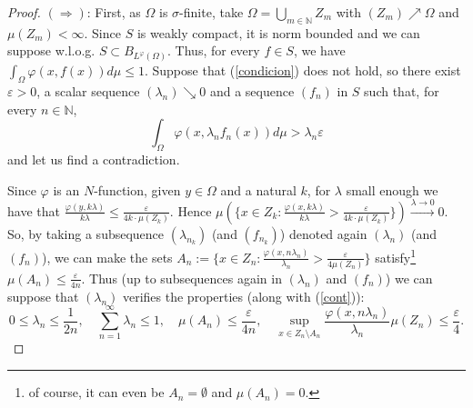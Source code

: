 \documentclass[11pt,a4paper]{amsart}
\begin{document}
\begin{proof}

$(\Rightarrow)$:
    First, as $\Omega$ is $\sigma$-finite, take $\Omega=\bigcup_{m\in\mathbb{N}} Z_m$ with $(Z_m)\nearrow \Omega$ and $\mu(Z_m)<\infty$. Since $S$ is weakly compact, it is norm bounded and we can suppose w.l.o.g. $S \subset B_{L^{\varphi}(\Omega)}$. Thus, for every $ f\in S$, we have  $\int_{\Omega}\varphi(x,f(x)) d\mu \leq 1.$
    Suppose that (\ref{condicion}) does not hold, so there exist $\varepsilon>0$, a scalar sequence $(\lambda_n)\searrow 0$ and a sequence $(f_n)$ in $S$ such that, for every $n\in\mathbb{N}$,
    \begin{equation}\label{cont}
    \int_{\Omega} \varphi(x, \lambda_n f_n(x))d\mu  > \lambda_n  \varepsilon
    \end{equation}
    and let us find a contradiction.

    Since $\varphi$ is an $N$-function, given $y\in\Omega$ and a natural $k$, for $\lambda$ small enough we have that $\frac{\varphi(y,k\lambda)}{k\lambda}\leq\frac{\varepsilon}{4k\cdot\mu(Z_k)}$. Hence $\mu(\{x\in Z_k:\frac{\varphi(x,k\lambda)}{k\lambda}>\frac{\varepsilon}{4k\cdot\mu(Z_k)}\})\xrightarrow{\lambda\rightarrow 0}0$. So, by taking a subsequence $(\lambda_{n_k})$ (and $(f_{n_k})$) denoted again $(\lambda_n)$ (and $(f_n)$), we can make the sets $A_n:=\{x\in Z_n: \frac{\varphi(x,n\lambda_n)}{\lambda_n}> \frac{\varepsilon}{4\mu(Z_n)}\}$ satisfy\footnote{of course, it can even be $A_n=\emptyset$ and $\mu(A_n)=0$.} $\mu(A_n)\leq \frac{\varepsilon}{4n}$.
    Thus (up to subsequences again in $(\lambda_n)$ and $(f_n)$) we can suppose that $(\lambda_n)$ verifies the properties (along with (\ref{cont})):
    \begin{equation}\label{coleccion}
    0\leq \lambda_n\leq \frac{1}{2n}, \quad
    \sum_{n=1}^{\infty} \lambda_n\leq 1, \quad
    \mu(A_n)\leq \frac{\varepsilon}{4n}, \quad
    \sup_{x\in Z_{n}\setminus A_n}\frac{\varphi(x,n \lambda_n)}{\lambda_n}\mu(Z_n)
    \leq\frac{\varepsilon}{4}.
    \end{equation}


\end{proof}
\end{document}

